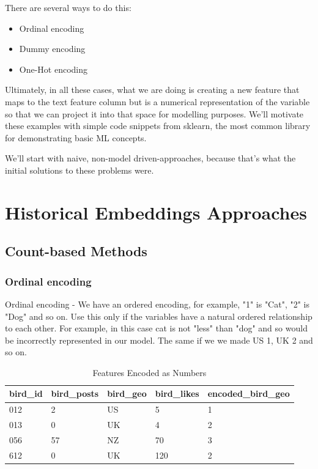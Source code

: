 \documentclass[11pt]{diazessay} %
\begin{document}
There are several ways to do this:

\begin{itemize}
  \item Ordinal encoding   
  \item Dummy encoding 
  \item One-Hot encoding
\end{itemize}

Ultimately, in all these cases, what we are doing is creating a new feature that maps to the text feature column but is a numerical representation of the variable so that we can project it into that space for modelling purposes. We'll motivate these examples with simple code snippets from sklearn, the most common library for demonstrating basic ML concepts. 

We'll start with naive, non-model driven-approaches, because that's what the initial solutions to these problems were. 

\section{Historical Embeddings Approaches}
\subsection{Count-based Methods}

\subsubsection{Ordinal encoding}
Ordinal encoding - We have an ordered encoding, for example, "1" is "Cat", "2" is "Dog" and so on. Use this only if the variables have a natural ordered relationship to each other. For example, in this case cat is not "less" than "dog" and so would be incorrectly represented in our model. The same if we we made US 1, UK 2 and so on. 

\begin{table}[H]
 \centering
    \caption{Features Encoded as Numbers}
\begin{tabular}{|l|l|l|l|l|}
\hline
\rowcolor[HTML]{EFEFEF} 
bird\_id & bird\_posts & bird\_geo & bird\_likes & encoded\_bird\_geo \\ \hline
012      & 2           & US        & 5           & 1                  \\ \hline
013      & 0           & UK        & 4           & 2                  \\ \hline
056      & 57          & NZ        & 70          & 3                  \\ \hline
612      & 0           & UK        & 120         & 2                  \\ \hline
\end{tabular}
\end{table}
\end{document}
